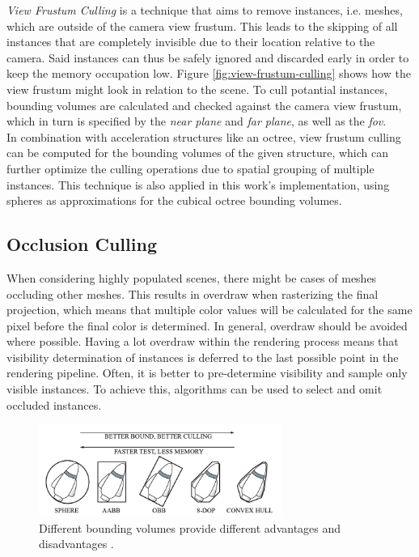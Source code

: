 \noindent
\emph{View Frustum Culling} is a technique that aims to remove instances, i.e. meshes, which are outside of the camera 
view frustum. This leads to the skipping of all instances that are completely invisible due to their location relative to 
the camera. Said instances can thus be safely ignored and discarded early in order to keep the memory occupation low. 
Figure \ref{fig:view-frustum-culling} shows how the view frustum might look in relation to the scene. 
To cull potantial instances, bounding volumes are calculated and checked against the camera view frustum, which in turn 
is specified by the \emph{near plane} and \emph{far plane}, as well as the \emph{fov}. \\

\noindent
In combination with acceleration structures like an octree, view frustum culling can be computed for the bounding 
volumes of the given structure, which can further optimize the culling operations due to spatial grouping of multiple 
instances. This technique is also applied in this work's implementation, using spheres as approximations for the 
cubical octree bounding volumes.


\subsection*{Occlusion Culling} \label{subsec-point-based-occlusion-culling}

When considering highly populated scenes, there might be cases of meshes occluding other meshes. This results 
in overdraw when rasterizing the final projection, which means that multiple color values will be calculated 
for the same pixel before the final color is determined. In general, overdraw should be avoided where possible. 
Having a lot overdraw within the rendering process means that visibility determination of instances is deferred 
to the last possible point in the rendering pipeline. Often, it is better to pre-determine visibility and sample 
only visible instances. To achieve this, algorithms can be used to select and omit occluded instances. \\

\begin{figure}[h]
    \centering
    \includegraphics[width=300px]{images/graphics/bounding-volume-quality.jpg}
    \caption{Different bounding volumes provide different advantages and disadvantages \cite{Six2021}.}
    \label{fig:bounding-volumes}
\end{figure}

